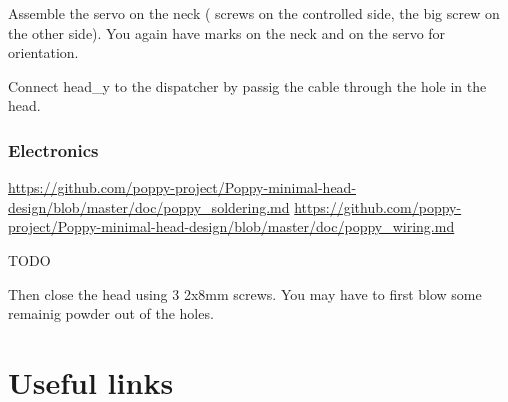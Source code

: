 \documentclass{article}
\begin{document}
Assemble the servo on the neck ( screws on the controlled side, the big screw on the other side). You again have marks on the neck and on the servo for orientation.

Connect head\_y to the dispatcher by passig the cable through the hole in the head.

\subsubsection{Electronics}

\url{https://github.com/poppy-project/Poppy-minimal-head-design/blob/master/doc/poppy_soldering.md}
\url{https://github.com/poppy-project/Poppy-minimal-head-design/blob/master/doc/poppy_wiring.md}

TODO
 

Then close the head using 3 \diameter 2x8mm screws. You may have to first blow some remainig powder out of the holes.
 

 




 
\section{Useful links}
\label{documentation-links}
\end{document}
